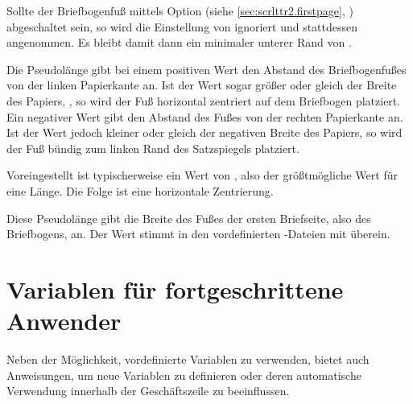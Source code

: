 Sollte der Briefbogenfuß mittels Option
%
%
(siehe \autoref{sec:scrlttr2.firstpage},
) abgeschaltet sein, so wird die
Einstellung von  ignoriert und stattdessen
 angenommen. Es bleibt damit dann
ein minimaler unterer Rand von .%
\EndIndexGroup


\begin{Declaration}
\end{Declaration}
Die Pseudolänge
 gibt bei einem
positiven Wert den Abstand des Briefbogenfußes von der linken Papierkante
an. Ist der Wert sogar größer oder gleich der Breite des Papiers,
, so wird der Fuß horizontal
zentriert auf dem Briefbogen platziert. Ein negativer Wert gibt den Abstand
des Fußes von der rechten Papierkante an. Ist der Wert jedoch kleiner oder
gleich der negativen Breite des Papiers, so wird der Fuß bündig zum linken
Rand des Satzspiegels platziert.

Voreingestellt ist typischerweise ein Wert von
, also der größtmögliche Wert für eine
Länge. Die Folge ist eine horizontale Zentrierung.%
\EndIndexGroup


\begin{Declaration}
\end{Declaration}
Diese Pseudolänge gibt die Breite des Fußes der ersten Briefseite, also des
Briefbogens, an. Der Wert stimmt in den vordefinierten -Dateien mit
%
 überein.%
%
\EndIndexGroup
%
\EndIndexGroup
%
\EndIndexGroup


\section{Variablen für fortgeschrittene Anwender}
\BeginIndexGroup
{}

Neben der Möglichkeit, vordefinierte Variablen zu verwenden, bietet
\KOMAScript{} auch Anweisungen, um neue Variablen zu definieren oder deren
automatische Verwendung innerhalb der Geschäftszeile zu beeinflussen.


